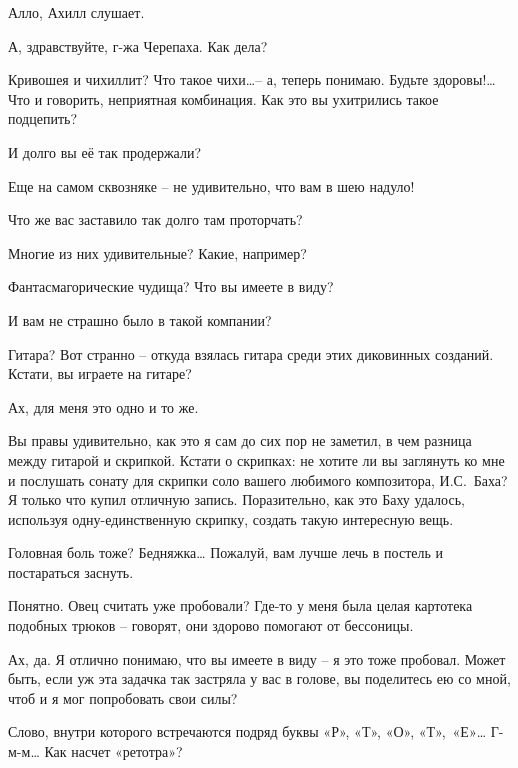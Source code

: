 \documentclass[../main.tex]{subfiles}
\begin{document}


\begin{dialogue}

 Алло, Ахилл слушает.

 А, здравствуйте, г-жа Черепаха. Как дела?

 Кривошея и чихиллит? Что такое чихи\ldots \--- а, теперь понимаю. Будьте здоровы!\ldots{} Что и говорить, неприятная комбинация. Как это вы ухитрились такое подцепить?

 И долго вы её так продержали?

 Еще на самом сквозняке \--- не удивительно, что вам в шею надуло!

 Что же вас заставило так долго там проторчать?

 Многие из них удивительные? Какие, например?

 Фантасмагорические чудища? Что вы имеете в виду?

 И вам не страшно было в такой компании?

 Гитара? Вот странно \--- откуда взялась гитара среди этих диковинных созданий. Кстати, вы играете на гитаре?

 Ах, для меня это одно и то же.

 Вы правы удивительно, как это я сам до сих пор не заметил, в чем разница между гитарой и скрипкой. Кстати о скрипках: не хотите ли вы заглянуть ко мне и послушать сонату для скрипки соло вашего любимого композитора, И.С.~Баха? Я только что купил отличную запись. Поразительно, как это Баху удалось, используя одну-единственную скрипку, создать такую интересную вещь.

 Головная боль тоже? Бедняжка\ldots{} Пожалуй, вам лучше лечь в постель и постараться заснуть.

 Понятно. Овец считать уже пробовали? Где-то у меня была целая картотека подобных трюков \--- говорят, они здорово помогают от бессоницы.

 Ах, да. Я отлично понимаю, что вы имеете в виду \--- я это тоже пробовал. Может быть, если уж эта задачка так застряла у вас в голове, вы поделитесь ею со мной, чтоб и я мог попробовать свои силы?

 Слово, внутри которого встречаются подряд буквы «Р», «Т», «О», «Т»,~«Е»\ldots{} Г-м-м\ldots{} Как насчет «ретотра»?


\end{dialogue}
\end{document}
